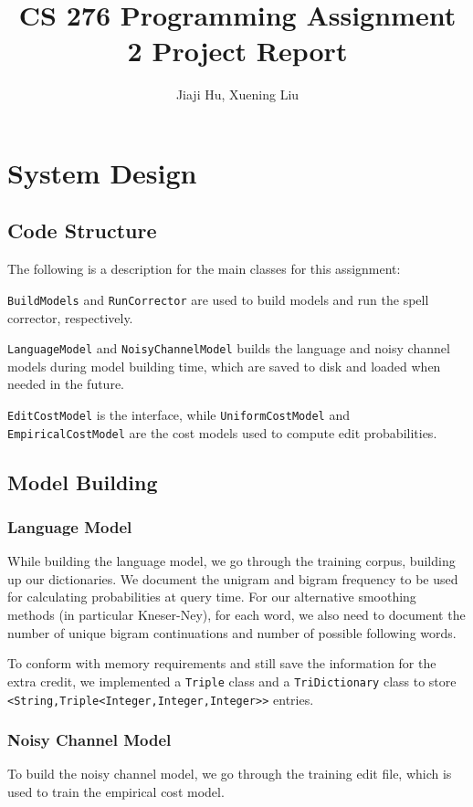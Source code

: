\documentclass[10pt]{article}
\begin{document}
\title{CS 276 Programming Assignment 2 Project Report}
\author{Jiaji Hu, Xuening Liu}
\date{}
\maketitle

\section{System Design}
\subsection{Code Structure}
The following is a description for the main classes for this assignment:

\texttt{BuildModels} and \texttt{RunCorrector} are used to build models and run the spell corrector, respectively.

\texttt{LanguageModel} and \texttt{NoisyChannelModel} builds the language and noisy channel models during model building time, which are saved to disk and loaded when needed in the future.

\texttt{EditCostModel} is the interface, while \texttt{UniformCostModel} and \texttt{EmpiricalCostModel} are the cost models used to compute edit probabilities.
\subsection{Model Building}
\subsubsection{Language Model}
While building the language model, we go through the training corpus, building up our dictionaries. We document the unigram and bigram frequency to be used for calculating probabilities at query time. For our alternative smoothing methods (in particular Kneser-Ney), for each word, we also need to document the number of unique bigram continuations and number of possible following words.

To conform with memory requirements and still save the information for the extra credit, we implemented a \texttt{Triple} class and a \texttt{TriDictionary} class to store \texttt{<String,Triple<Integer,Integer,Integer>>} entries.
\subsubsection{Noisy Channel Model}
To build the noisy channel model, we go through the training edit file, which is used to train the empirical cost model.
\end{document}
